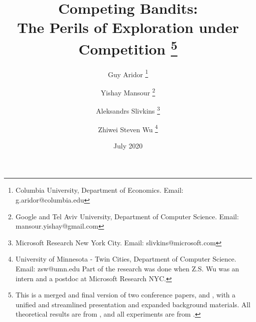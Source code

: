 \documentclass[11pt]{article}
\begin{document}

\title{Competing Bandits:\\
The Perils of Exploration under Competition%
\thanks{This is a merged and final version of two conference papers,
\citet{CompetingBandits-itcs18} and \citet{CompetingBandits-ec19},
with a unified and streamlined presentation and expanded background materials. All theoretical results are from \citet{CompetingBandits-itcs18}, and all experiments are from \citet{CompetingBandits-ec19}.}}

\author{Guy Aridor%
\footnote{Columbia University, Department of Economics. Email: g.aridor@columbia.edu}
\and
Yishay Mansour%
\footnote{Google and Tel Aviv University, Department of Computer Science. Email: mansour.yishay@gmail.com}
\and
Aleksandrs Slivkins%
\footnote{Microsoft Research New York City. Email: slivkins@microsoft.com}
\and
Zhiwei Steven Wu%
\footnote{University of Minnesota - Twin Cities, Department of Computer Science. Email: zsw@umn.edu\newline
Part of the research was done when Z.S. Wu was an intern and a postdoc at Microsoft Research NYC.
}}
\date{July 2020}
\maketitle
\end{document}
